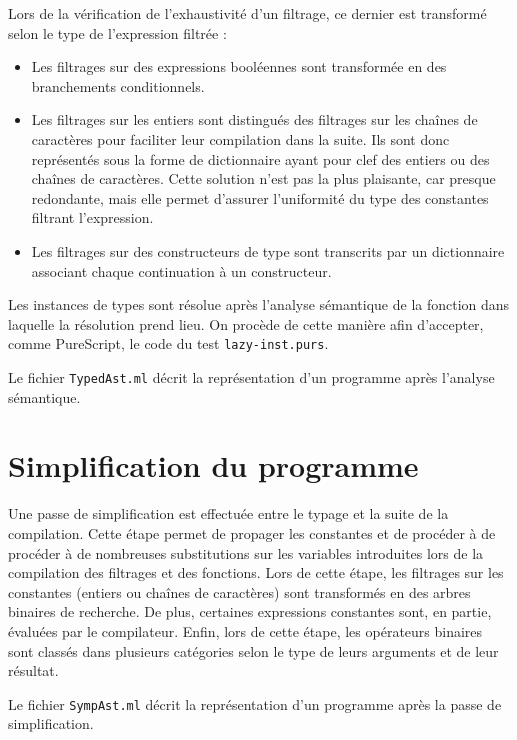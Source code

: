 \documentclass[french, 12pt]{article}
\newcommand{\ps}{\textsf{PureScript}}
\begin{document}
Lors de la vérification de l'exhaustivité d'un filtrage, ce dernier est
transformé selon le type de l'expression filtrée :
\begin{itemize}
    \item Les filtrages sur des expressions booléennes sont transformée en des
          branchements conditionnels.
    \item Les filtrages sur les entiers sont distingués des filtrages
          sur les chaînes de caractères pour faciliter leur compilation dans la
          suite. Ils sont donc représentés sous la forme de dictionnaire ayant
          pour clef des entiers ou des chaînes de caractères. Cette solution
          n'est pas la plus plaisante, car presque redondante, mais elle permet
          d'assurer l'uniformité du type des constantes filtrant l'expression.
    \item Les filtrages sur des constructeurs de type sont transcrits par un
          dictionnaire associant chaque continuation à un constructeur.
\end{itemize}

Les instances de types sont résolue après l'analyse sémantique de la fonction
dans laquelle la résolution prend lieu. On procède de cette manière afin
d'accepter, comme \ps, le code du test \mbox{\texttt{lazy-inst.purs}}.

Le fichier \texttt{TypedAst.ml} décrit la représentation d'un programme après
l'analyse sémantique.

\section*{Simplification du programme}
Une passe de simplification est effectuée entre le typage et la suite de la
compilation. Cette étape permet de propager les constantes et de procéder à de
procéder à de nombreuses substitutions sur les variables introduites lors de la
compilation des filtrages et des fonctions. Lors de cette étape, les filtrages
sur les constantes (entiers ou chaînes de caractères) sont transformés en des
arbres binaires de recherche. De plus, certaines expressions constantes sont, en
partie, évaluées par le compilateur. Enfin, lors de cette étape, les opérateurs
binaires sont classés dans plusieurs catégories selon le type de leurs arguments
et de leur résultat.

Le fichier \texttt{SympAst.ml} décrit la représentation d'un programme après
la passe de simplification.
\end{document}
